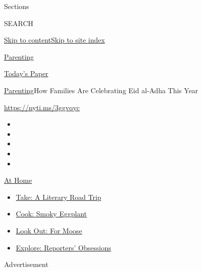 Sections

SEARCH

\protect\hyperlink{site-content}{Skip to
content}\protect\hyperlink{site-index}{Skip to site index}

\href{https://www.nytimes.com/section/parenting}{Parenting}

\href{https://myaccount.nytimes.com/auth/login?response_type=cookie\&client_id=vi}{}

\href{https://www.nytimes.com/section/todayspaper}{Today's Paper}

\href{/section/parenting}{Parenting}\textbar{}How Families Are
Celebrating Eid al-Adha This Year

\url{https://nyti.ms/3ggvqyc}

\begin{itemize}
\item
\item
\item
\item
\item
\end{itemize}

\href{https://www.nytimes.com/spotlight/at-home?action=click\&pgtype=Article\&state=default\&region=TOP_BANNER\&context=at_home_menu}{At
Home}

\begin{itemize}
\tightlist
\item
  \href{https://www.nytimes.com/2020/07/28/books/time-for-a-literary-road-trip.html?action=click\&pgtype=Article\&state=default\&region=TOP_BANNER\&context=at_home_menu}{Take:
  A Literary Road Trip}
\item
  \href{https://www.nytimes.com/2020/07/29/magazine/bored-with-your-home-cooking-some-smoky-eggplant-will-fix-that.html?action=click\&pgtype=Article\&state=default\&region=TOP_BANNER\&context=at_home_menu}{Cook:
  Smoky Eggplant}
\item
  \href{https://www.nytimes.com/2020/07/27/travel/moose-michigan-isle-royale.html?action=click\&pgtype=Article\&state=default\&region=TOP_BANNER\&context=at_home_menu}{Look
  Out: For Moose}
\item
  \href{https://www.nytimes.com/interactive/2020/at-home/even-more-reporters-editors-diaries-lists-recommendations.html?action=click\&pgtype=Article\&state=default\&region=TOP_BANNER\&context=at_home_menu}{Explore:
  Reporters' Obsessions}
\end{itemize}

Advertisement

